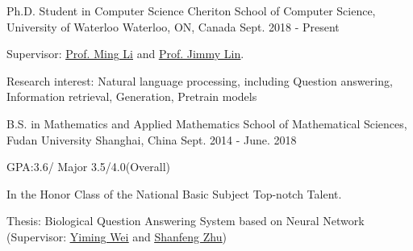 

\begin{cventries}

 \cventry
    {Ph.D. Student in Computer Science} %
    {Cheriton School of Computer Science, University of Waterloo} %
    {Waterloo, ON, Canada} %
    {Sept. 2018 - Present} %
    {
      \begin{cvitems} %
        \item {Supervisor: {\href{https://cs.uwaterloo.ca/~mli/}{\underline{Prof. Ming Li}}} and {\href{https://cs.uwaterloo.ca/~jimmylin/}{\underline{Prof. Jimmy Lin}}}.}
        \item {Research interest: Natural language processing, including Question answering, Information retrieval, Generation, Pretrain models  }
      \end{cvitems}
    }
      \cventry
    {B.S. in Mathematics and Applied Mathematics} %
    {School of Mathematical Sciences, Fudan University} %
    {Shanghai, China} %
    {Sept. 2014 - June. 2018} %
    {
      \begin{cvitems} %
      \item{GPA:3.6/ Major 3.5/4.0(Overall)}
      \item {In the Honor Class of the National Basic Subject Top-notch Talent.}
      \item{Thesis: Biological Question Answering System based on Neural Network (Supervisor: {\href{http://math.fudan.edu.cn/en/Data/View/222}{\underline{Yiming Wei}}} and {\href{https://dblp.org/pers/hd/z/Zhu:Shanfeng}{\underline{Shanfeng Zhu}}})}
      \end{cvitems}
    }

\end{cventries}
